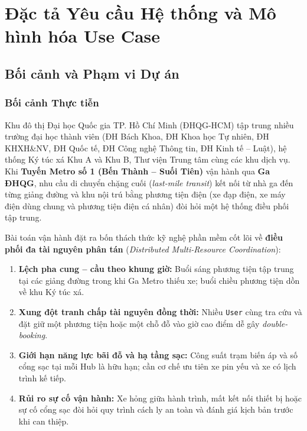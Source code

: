 \section{Đặc tả Yêu cầu Hệ thống và Mô hình hóa Use Case}

\subsection{Bối cảnh và Phạm vi Dự án}

\subsubsection*{Bối cảnh Thực tiễn}
Khu đô thị Đại học Quốc gia TP. Hồ Chí Minh (ĐHQG-HCM) tập trung nhiều trường đại học thành viên (ĐH Bách Khoa, ĐH Khoa học Tự nhiên, ĐH KHXH\&NV, ĐH Quốc tế, ĐH Công nghệ Thông tin, ĐH Kinh tế -- Luật), hệ thống Ký túc xá Khu A và Khu B, Thư viện Trung tâm cùng các khu dịch vụ. Khi \textbf{Tuyến Metro số 1 (Bến Thành -- Suối Tiên)} vận hành qua \textbf{Ga ĐHQG}, nhu cầu di chuyển chặng cuối (\textit{last-mile transit}) kết nối từ nhà ga đến từng giảng đường và khu nội trú bằng phương tiện điện (xe đạp điện, xe máy điện dùng chung và phương tiện điện cá nhân) đòi hỏi một hệ thống điều phối tập trung.

Bài toán vận hành đặt ra bốn thách thức kỹ nghệ phần mềm cốt lõi về \textbf{điều phối đa tài nguyên phân tán} (\textit{Distributed Multi-Resource Coordination}):
\begin{enumerate}[leftmargin=*,nosep]
    \item \textbf{Lệch pha cung -- cầu theo khung giờ:} Buổi sáng phương tiện tập trung tại các giảng đường trong khi Ga Metro thiếu xe; buổi chiều phương tiện dồn về khu Ký túc xá.
    \item \textbf{Xung đột tranh chấp tài nguyên đồng thời:} Nhiều \texttt{User} cùng tra cứu và đặt giữ một phương tiện hoặc một chỗ đỗ vào giờ cao điểm dễ gây \textit{double-booking}.
    \item \textbf{Giới hạn năng lực bãi đỗ và hạ tầng sạc:} Công suất trạm biến áp và số cổng sạc tại mỗi Hub là hữu hạn; cần cơ chế ưu tiên xe pin yếu và xe có lịch trình kế tiếp.
    \item \textbf{Rủi ro sự cố vận hành:} Xe hỏng giữa hành trình, mất kết nối thiết bị hoặc sự cố cổng sạc đòi hỏi quy trình cách ly an toàn và đánh giá kịch bản trước khi can thiệp.
\end{enumerate}


